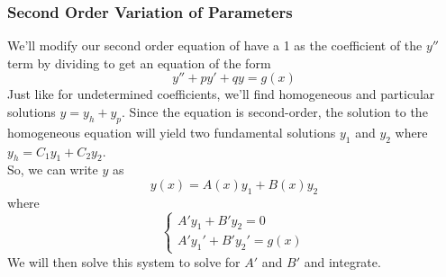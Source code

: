 \subsubsection{Second Order Variation of Parameters}
\noindent
We'll modify our second order equation of have a 1 as the coefficient of the $y''$ term by dividing to get an equation of the form
\begin{equation*}
	y'' + py' + qy = g(x)
\end{equation*}
Just like for undetermined coefficients, we'll find homogeneous and particular solutions $y = y_h + y_p$. Since the equation is second-order, the solution to the homogeneous equation will yield two fundamental solutions $y_1$ and $y_2$ where $y_h = C_1y_1 + C_2y_2$.\\

\noindent
So, we can write $y$ as
\begin{equation*}
	y(x) = A(x)y_1 + B(x)y_2
\end{equation*}
where
\begin{equation*}
	\begin{cases}
		A'y_1  + B'y_2  = 0 \\
		A'y_1' + B'y_2' = g(x)
	\end{cases}
\end{equation*}
We will then solve this system to solve for $A'$ and $B'$ and integrate.

\ifodd{}\fi